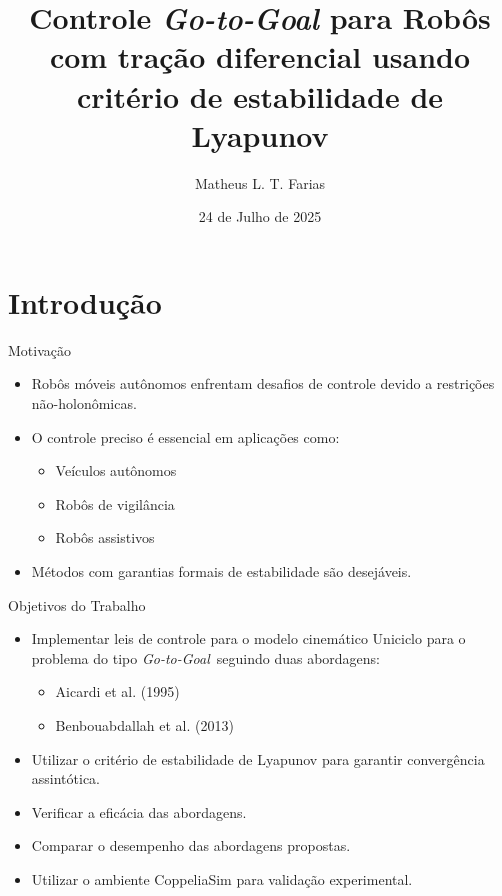 \documentclass{beamer}
\title{Controle \textit{Go-to-Goal} para Robôs com tração diferencial usando critério de estabilidade de Lyapunov}
\author{Matheus L. T. Farias}
\institute{Automação Inteligente}
\date{24 de Julho de 2025}
\begin{document}
\frame{\titlepage}
\section{Introdução}

\begin{frame}{Motivação}
  \begin{itemize}
    \item Robôs móveis autônomos enfrentam desafios de controle devido a restrições não-holonômicas.
    \item O controle preciso é essencial em aplicações como:
    \begin{itemize}
        \item Veículos autônomos
        \item Robôs de vigilância
        \item Robôs assistivos
    \end{itemize}
    \item Métodos com garantias formais de estabilidade são desejáveis.
  \end{itemize}
\end{frame}
\begin{frame}{Objetivos do Trabalho}
  \begin{itemize}
    \item Implementar leis de controle para o modelo cinemático Uniciclo para o problema do tipo \textit{Go-to-Goal}\ seguindo duas abordagens:
    \begin{itemize}
        \item Aicardi et al. (1995)
        \item Benbouabdallah et al. (2013)
    \end{itemize}
    \item Utilizar o critério de estabilidade de Lyapunov para garantir convergência assintótica.
    \item Verificar a eficácia das abordagens.
    \item Comparar o desempenho das abordagens propostas.
    \item Utilizar o ambiente CoppeliaSim para validação experimental.
  \end{itemize}
\end{frame}
\end{document}
